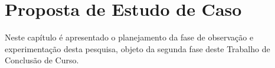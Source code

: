 \chapter{Proposta de Estudo de Caso}
\label{ch:proposta}

Neste capítulo é apresentado o planejamento da fase de observação e experimentação desta pesquisa, objeto da segunda fase deste Trabalho de Conclusão de Curso.











